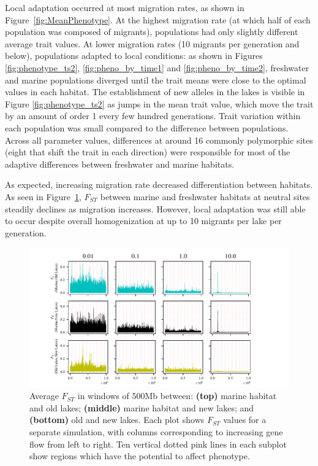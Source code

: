 \documentclass{article}
\begin{document}
Local adaptation occurred at most migration rates,
as shown in Figure~\ref{fig:MeanPhenotype}.
At the highest migration rate (at which half of each population was composed of migrants),
populations had only slightly different average trait values.
At lower migration rates (10 migrants per generation and below),
populations adapted to local conditions:
as shown in Figures \ref{fig:phenotype_ts2},
\ref{fig:pheno_by_time1} and \ref{fig:pheno_by_time2},
freshwater and marine populations diverged
until the trait means were close to the optimal values in each habitat. 
The establishment of new alleles in the lakes is visible in Figure \ref{fig:phenotype_ts2}
as jumps in the mean trait value,
which move the trait by an amount of order 1 every few hundred generations.
Trait variation within each population was small compared to the difference between populations.
Across all parameter values, differences at around 16 commonly polymorphic sites 
(eight that shift the trait in each direction)
were responsible for most of the adaptive differences between freshwater and marine habitats.

As expected, increasing migration rate decreased differentiation between habitats. 
As seen in Figure~\ref{fig:Fst}, 
$F_{ST}$ between marine and freshwater habitats 
at neutral sites steadily declines as migration increases. 
However, local adaptation was still able to occur despite overall homogenization 
at up to 10 migrants per lake per generation.

\begin{figure}
	\begin{center}
        \includegraphics[width=\textwidth]{Final_Plots/Fst_Genome.pdf}
  		\caption{
		Average $F_{ST}$ in windows of 500Mb between:
        \textbf{(top)} marine habitat and old lakes;
        \textbf{(middle)} marine habitat and new lakes; and
        \textbf{(bottom)} old and new lakes.
        Each plot shows $F_{ST}$ values for a separate simulation,
        with columns corresponding to increasing gene flow from left to right.
		Ten vertical dotted pink lines in each subplot 
        show regions which have the potential to affect phenotype.
     } \label{fig:Fst}
	\end{center}
\end{figure}
\end{document}
